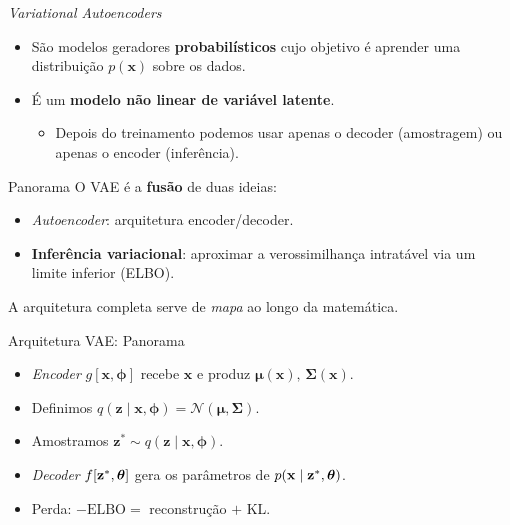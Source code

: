 \documentclass[aspectratio=169,xcolor=dvipsnames]{beamer}
\begin{document}
  \begin{frame}{\textit{Variational Autoencoders}}
    \begin{itemize}
      \item São modelos geradores \textbf{probabilísticos} cujo objetivo
      é aprender uma distribuição $p(\mathbf{x})$ sobre os dados.
      \item É um \textbf{modelo não linear de variável latente}.
      \begin{itemize}
        \item Depois do treinamento podemos usar apenas o decoder
        (amostragem) ou apenas o encoder (inferência).
      \end{itemize}
    \end{itemize}
    \begin{block}{Panorama}
      O VAE é a \textbf{fusão} de duas ideias:
      \begin{itemize}
        \item \textit{Autoencoder}: arquitetura encoder/decoder.
        \item \textbf{Inferência variacional}: aproximar a
        verossimilhança intratável via um limite inferior (ELBO).
      \end{itemize}
    \end{block}
    \vspace{0.2em}
    \footnotesize A arquitetura completa serve de \emph{mapa} ao longo da
    matemática.
  \end{frame}

  \begin{frame}{Arquitetura VAE: Panorama}

    \begin{itemize}
      \item \textcolor{EncRed}{\textit{Encoder}} $g[\mathbf{x},\bm{\phi}]$ recebe
      $\mathbf{x}$ e produz $\boldsymbol{\mu}(\mathbf{x}),\, \boldsymbol{\Sigma}(\mathbf{x})$.
      \item Definimos
      $q(\mathbf{z}\mid \mathbf{x},\bm{\phi}) = \mathcal{N}(\boldsymbol{\mu}, \boldsymbol{\Sigma})$.
      \item Amostramos $\mathbf{z}^{*} \sim q(\mathbf{z}\mid \mathbf{x},\bm{\phi})$.
      \item \textcolor{DecBlue}{\textit{Decoder}} $f[\mathbf{z}^{*},\bm{\theta}]$
      gera os parâmetros de $p(\mathbf{x}\mid \mathbf{z}^{*},\bm{\theta})$.
      \item Perda: $-\mathrm{ELBO} =$ reconstrução $+$ KL.
    \end{itemize}

    \end{frame}
\end{document}

